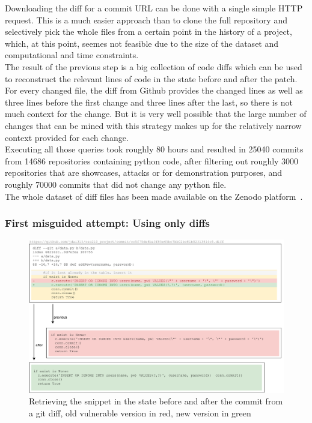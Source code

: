 \documentclass[
a4paper,
pagesize,
pdftex,
12pt,
twoside, %
BCOR=5mm, %
ngerman,
fleqn,
final,
]{scrartcl}
\begin{document}
	Downloading the diff for a commit URL can be done with a single simple HTTP request. This is a much easier approach than to clone the full repository and selectively pick the whole files from a certain point in the history of a project, which, at this point, seemes not feasible due to the size of the dataset and computational and time constraints. \\
	The result of the previous step is a big collection of code diffs which can be used to reconstruct the relevant lines of code in the state before and after the patch. For every changed file, the diff from Github provides the changed lines as well as three lines before the first change and three lines after the last, so there is not much context for the change. 
	But it is very well possible that the large number of changes that can be mined with this strategy makes up for the relatively narrow context provided for each change.\\
	Executing all those queries took roughly 80 hours and resulted in 25040 commits from 14686 repositories containing python code, after filtering out roughly 3000 repositories that are showcases, attacks or for demonstration purposes, and roughly 70000 commits that did not change any python file.\\
	The whole dataset of diff files has been made available on the Zenodo platform~\cite{Wartschinski.1.12.2019b}.	
	
	\subsubsection{First misguided attempt: Using only diffs}
	
	\begin{figure}[ht]
		\centering
		\includegraphics[width=\linewidth]{img/GitCommitPreviousAfter}
		\caption{Retrieving the snippet in the state before and after the commit from a git diff, old vulnerable version in red, new version in green}
		\label{fig:gitdiff}
	\end{figure}
	
\end{document}
